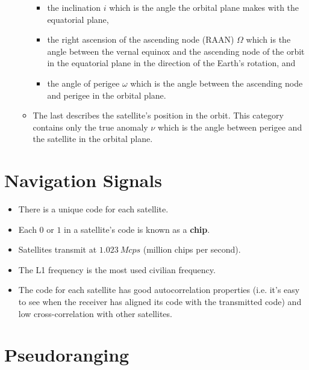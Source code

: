 \documentclass{article}
\begin{document}
\begin{itemize}
\begin{itemize}
                \begin{itemize}
                  \item the inclination $i$ which is the angle the orbital plane makes with the equatorial plane,

                  \item the right ascension of the ascending node (RAAN) $\Omega$ which is the angle between the vernal equinox and the ascending node of the orbit in the equatorial plane in the direction of the Earth's rotation, and

                  \item the angle of perigee $\omega$ which is the angle between the ascending node and perigee in the orbital plane.
                \end{itemize}

          \item The last describes the satellite's position in the orbit. This category contains only the true anomaly $\nu$ which is the angle between perigee and the satellite in the orbital plane.
        \end{itemize}
\end{itemize}

\section{Navigation Signals}

\begin{itemize}
  \item There is a unique code for each satellite.

  \item Each $0$ or $1$ in a satellite's code is known as a \textbf{chip}.

  \item Satellites transmit at $\qty{1.023}{Mcps}$ (million chips per second).

  \item The L1 frequency is the most used civilian frequency.

  \item The code for each satellite has good autocorrelation properties (i.e. it's easy to see when the receiver has aligned its code with the transmitted code) and low cross-correlation with other satellites.
\end{itemize}

\section{Pseudoranging}
\end{document}
